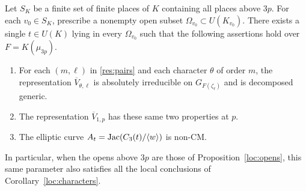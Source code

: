 \begin{proposition}\label{res:specialization}
Let $S_K$ be a finite set of finite places of $K$ containing all
places above $3p$.  For each $v_0\in S_K$, prescribe a nonempty
open subset $\Omega_{v_0}\subset U(K_{v_0})$.  There exists a
single $t\in U(K)$ lying in every $\Omega_{v_0}$ such that the
following assertions hold over $F=K(\mu_{3p})$.
\begin{enumerate}
\item For each $(m,\ell)$ in \eqref{res:pairs} and each character
$\theta$ of order $m$, the representation
$\overline V_{\theta,\ell}$ is absolutely irreducible on
$G_{F(\zeta_\ell)}$ and is decomposed generic.
\item The representation $\overline V_{1,p}$ has these same two
properties at $p$.
\item The elliptic curve $A_t=\operatorname{Jac}(C_3(t)/\langle w\rangle)$ is
non-CM.
\end{enumerate}
In particular, when the opens above $3p$ are those of
Proposition~\ref{loc:opens}, this same parameter also satisfies
all the local conclusions of Corollary~\ref{loc:characters}.
\end{proposition}

